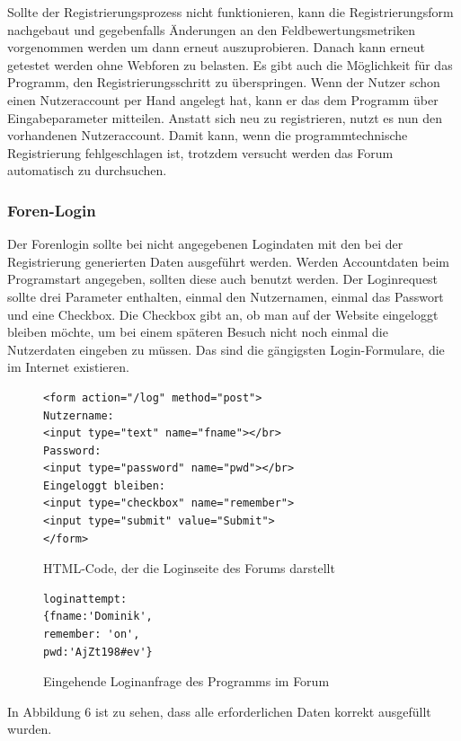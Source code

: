 Sollte der Registrierungsprozess nicht funktionieren, kann die Registrierungsform nachgebaut und gegebenfalls Änderungen an den Feldbewertungsmetriken vorgenommen werden um dann erneut auszuprobieren. Danach kann erneut getestet werden ohne Webforen zu belasten. Es gibt auch die Möglichkeit für das Programm, den Registrierungsschritt zu überspringen. Wenn der Nutzer schon einen Nutzeraccount per Hand angelegt hat, kann er das dem Programm über Eingabeparameter mitteilen. Anstatt sich neu zu registrieren, nutzt es nun den vorhandenen Nutzeraccount. Damit kann, wenn die programmtechnische Registrierung fehlgeschlagen ist, trotzdem versucht werden das Forum automatisch zu durchsuchen.

\subsubsection{Foren-Login}
Der Forenlogin sollte bei nicht angegebenen Logindaten mit den bei der Registrierung generierten Daten ausgeführt werden. Werden Accountdaten beim Programstart angegeben, sollten diese auch benutzt werden. Der Loginrequest sollte drei Parameter enthalten, einmal den Nutzernamen, einmal das Passwort und eine Checkbox. Die Checkbox gibt an, ob man auf der Website eingeloggt bleiben möchte, um bei einem späteren Besuch nicht noch einmal die Nutzerdaten eingeben zu müssen. Das sind die gängigsten Login-Formulare, die im Internet existieren.

\begin{figure}[ht]
\begin{lstlisting}[language=HTML5]
<form action="/log" method="post">
Nutzername: 
<input type="text" name="fname"></br>
Password: 
<input type="password" name="pwd"></br>
Eingeloggt bleiben: 
<input type="checkbox" name="remember">
<input type="submit" value="Submit">
</form>
\end{lstlisting}
\caption{HTML-Code, der die Loginseite des Forums darstellt}
\end{figure}


\begin{figure}[h!]
\begin{lstlisting}[language=HTML5]
loginattempt: 
{fname:'Dominik',
remember: 'on',
pwd:'AjZt198#ev'}
\end{lstlisting}
\caption{Eingehende Loginanfrage des Programms im Forum}
\end{figure}

In Abbildung 6 ist zu sehen, dass alle erforderlichen Daten korrekt ausgefüllt wurden.

